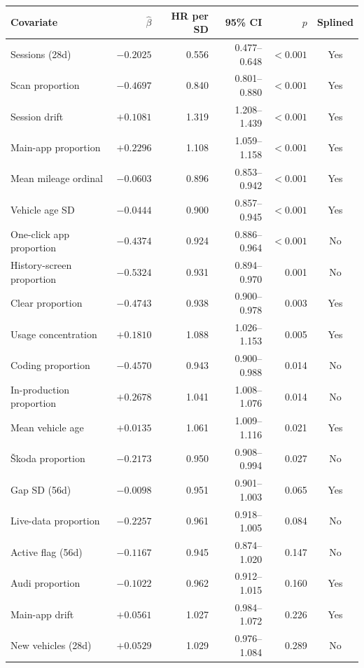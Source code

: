 \begin{table}[htbp]
\centering
\small
\begin{tabular}{@{}lrrrrc@{}}
\toprule
Covariate & $\hat\beta$ & HR per SD & 95\% CI & $p$ & Splined \\
\midrule
Sessions (28d)               & $-0.2025$ & 0.556 & 0.477--0.648 & $<0.001$ & Yes \\
Scan proportion              & $-0.4697$ & 0.840 & 0.801--0.880 & $<0.001$ & Yes \\
Session drift                & $+0.1081$ & 1.319 & 1.208--1.439 & $<0.001$ & Yes \\
Main-app proportion          & $+0.2296$ & 1.108 & 1.059--1.158 & $<0.001$ & Yes \\
Mean mileage ordinal         & $-0.0603$ & 0.896 & 0.853--0.942 & $<0.001$ & Yes \\
Vehicle age SD               & $-0.0444$ & 0.900 & 0.857--0.945 & $<0.001$ & Yes \\
One-click app proportion     & $-0.4374$ & 0.924 & 0.886--0.964 & $<0.001$ & No \\
History-screen proportion    & $-0.5324$ & 0.931 & 0.894--0.970 & 0.001 & No \\
Clear proportion             & $-0.4743$ & 0.938 & 0.900--0.978 & 0.003 & Yes \\
Usage concentration          & $+0.1810$ & 1.088 & 1.026--1.153 & 0.005 & Yes \\
Coding proportion            & $-0.4570$ & 0.943 & 0.900--0.988 & 0.014 & No \\
In-production proportion     & $+0.2678$ & 1.041 & 1.008--1.076 & 0.014 & No \\
Mean vehicle age             & $+0.0135$ & 1.061 & 1.009--1.116 & 0.021 & Yes \\
Škoda proportion             & $-0.2173$ & 0.950 & 0.908--0.994 & 0.027 & No \\
\midrule
Gap SD (56d)                 & $-0.0098$ & 0.951 & 0.901--1.003 & 0.065 & Yes \\
Live-data proportion         & $-0.2257$ & 0.961 & 0.918--1.005 & 0.084 & No \\
Active flag (56d)            & $-0.1167$ & 0.945 & 0.874--1.020 & 0.147 & No \\
Audi proportion              & $-0.1022$ & 0.962 & 0.912--1.015 & 0.160 & Yes \\
Main-app drift               & $+0.0561$ & 1.027 & 0.984--1.072 & 0.226 & Yes \\
New vehicles (28d)           & $+0.0529$ & 1.029 & 0.976--1.084 & 0.289 & No \\

\end{tabular}
\end{table}

